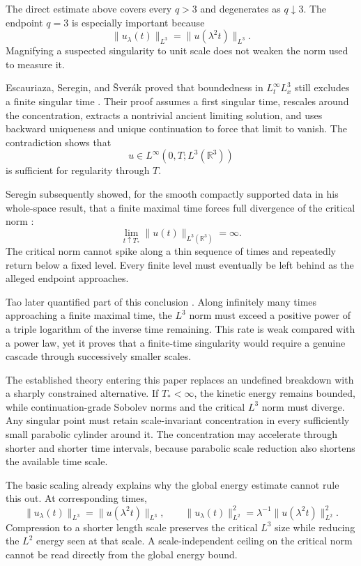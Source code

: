 The direct estimate above covers every \(q>3\) and degenerates as \(q\downarrow3\).
The endpoint \(q=3\) is especially important because
\[
  \lVert u_\lambda(t)\rVert_{L^3}
  =
  \lVert u(\lambda^2t)\rVert_{L^3}.
\]
Magnifying a suspected singularity to unit scale does not weaken the norm used to measure it.

Escauriaza, Seregin, and \v{S}ver{\'a}k proved that boundedness in \(L^\infty_tL^3_x\) still excludes a finite singular time \parencite{EscauriazaSereginSverak2003}.
Their proof assumes a first singular time, rescales around the concentration, extracts a nontrivial ancient limiting solution, and uses backward uniqueness and unique continuation to force that limit to vanish.
The contradiction shows that
\[
  u\in L^\infty(0,T;L^3(\mathbb R^3))
\]
is sufficient for regularity through \(T\).

Seregin subsequently showed, for the smooth compactly supported data in his whole-space result, that a finite maximal time forces full divergence of the critical norm \parencite{Seregin2012}:
\[
  \lim_{t\uparrow T_*}\lVert u(t)\rVert_{L^3(\mathbb R^3)}
  =
  \infty.
\]
The critical norm cannot spike along a thin sequence of times and repeatedly return below a fixed level.
Every finite level must eventually be left behind as the alleged endpoint approaches.

Tao later quantified part of this conclusion \parencite{Tao2021Quantitative}.
Along infinitely many times approaching a finite maximal time, the \(L^3\) norm must exceed a positive power of a triple logarithm of the inverse time remaining.
This rate is weak compared with a power law, yet it proves that a finite-time singularity would require a genuine cascade through successively smaller scales.


The established theory entering this paper replaces an undefined breakdown with a sharply constrained alternative.
If \(T_*<\infty\), the kinetic energy remains bounded, while continuation-grade Sobolev norms and the critical \(L^3\) norm must diverge.
Any singular point must retain scale-invariant concentration in every sufficiently small parabolic cylinder around it.
The concentration may accelerate through shorter and shorter time intervals, because parabolic scale reduction also shortens the available time scale.

The basic scaling already explains why the global energy estimate cannot rule this out.
At corresponding times,
\[
  \lVert u_\lambda(t)\rVert_{L^3}
  =
  \lVert u(\lambda^2t)\rVert_{L^3},
  \qquad
  \lVert u_\lambda(t)\rVert_{L^2}^{2}
  =
  \lambda^{-1}\lVert u(\lambda^2t)\rVert_{L^2}^{2}.
\]
Compression to a shorter length scale preserves the critical \(L^3\) size while reducing the \(L^2\) energy seen at that scale.
A scale-independent ceiling on the critical norm cannot be read directly from the global energy bound.

